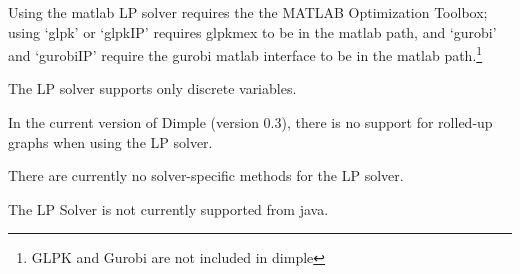 Using the matlab LP solver requires the the MATLAB Optimization Toolbox; using `glpk' or `glpkIP' requires glpkmex to be in the matlab path, and `gurobi' and `gurobiIP' require the gurobi matlab interface to be in the matlab path.\footnote{GLPK and Gurobi are not included in dimple}

The LP solver supports only discrete variables.

In the current version of Dimple (version 0.3), there is no support for rolled-up graphs when using the LP solver.

There are currently no solver-specific methods for the LP solver.

\fi

\ifjava
The LP Solver is not currently supported from java.
\fi
